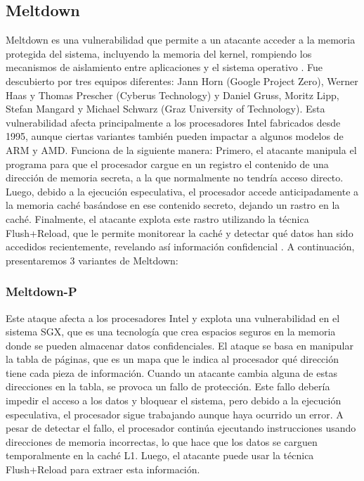 \documentclass[lettersize,compsoc]{IEEEtran}
\begin{document}
\subsection{Meltdown}
Meltdown es una vulnerabilidad que permite a un atacante acceder a la memoria protegida del sistema, incluyendo la memoria del kernel, rompiendo los mecanismos de aislamiento entre aplicaciones y el sistema operativo \cite{meltdown}.
\newline Fue descubierto por tres equipos diferentes: Jann Horn (Google Project Zero), Werner Haas y Thomas Prescher (Cyberus Technology) y Daniel Gruss, Moritz Lipp, Stefan Mangard y Michael Schwarz (Graz University of Technology).
\newline Esta vulnerabilidad afecta principalmente a los procesadores Intel fabricados desde 1995, aunque ciertas variantes también pueden impactar a algunos modelos de ARM y AMD.
\newline Funciona de la siguiente manera:
\newline Primero, el atacante manipula el programa para que el procesador cargue en un registro el contenido de una dirección de memoria secreta, a la que normalmente no tendría acceso directo.
Luego, debido a la ejecución especulativa, el procesador accede anticipadamente a la memoria caché basándose en ese contenido secreto, dejando un rastro en la caché.
Finalmente, el atacante explota este rastro utilizando la técnica Flush+Reload, que le permite monitorear la caché y detectar qué datos han sido accedidos recientemente, revelando así información confidencial \cite{meltdown}.
\newline A continuación, presentaremos 3 variantes de Meltdown:

\subsubsection{\textbf{Meltdown-P}}
Este ataque afecta a los procesadores Intel y explota una vulnerabilidad en el sistema SGX, que es una tecnología que crea espacios seguros en la memoria donde se pueden almacenar datos confidenciales.
\newline El ataque se basa en manipular la tabla de páginas, que es un mapa que le indica al procesador qué dirección tiene cada pieza de información. Cuando un atacante cambia alguna de estas direcciones en la tabla, se provoca un fallo de protección. Este fallo debería impedir el acceso a los datos y bloquear el sistema, pero debido a la ejecución especulativa, el procesador sigue trabajando aunque haya ocurrido un error. A pesar de detectar el fallo, el procesador continúa ejecutando instrucciones usando direcciones de memoria incorrectas, lo que hace que los datos se carguen temporalmente en la caché L1. Luego, el atacante puede usar la técnica Flush+Reload para extraer esta información.
\end{document}
